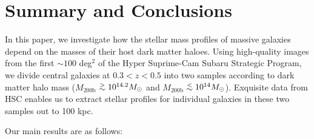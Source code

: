 \documentclass[a4paper,fleqn,usenatbib]{mnras}
\def\simlt{\lower.5ex\hbox{$\; \buildrel < \over {\sim} \;$}}
\def\simgt{\lower.5ex\hbox{$\; \buildrel > \over {\sim} \;$}}
\def\mhalo{{$M_{\mathrm{200b}}$}}
\begin{document}
\section{Summary and Conclusions}
    \label{sec:summary}
    
    In this paper, we investigate how the stellar mass profiles of massive galaxies depend on the masses of their host dark matter haloes. Using high-quality images from the first $\sim100$ deg$^2$ of the 
    Hyper Suprime-Cam Subaru Strategic Program, we divide central galaxies at $0.3 < z < 0.5$ into two samples according to dark matter halo mass (\mhalo{}$\simgt 10^{14.2} M_{\odot}$ and 
    \mhalo{}$\simlt 10^{14} M_{\odot}$). Exquisite data from HSC enables us to extract stellar profiles for individual galaxies in these two samples out to 100 kpc.
    
    Our main results are as follows:  
    
\end{document}
